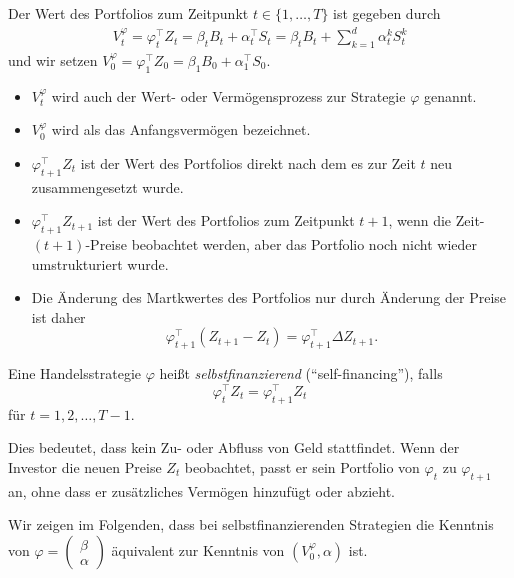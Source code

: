 \documentclass[a4paper,twoside,DIV15,BCOR12mm]{scrbook}
\begin{document}
\begin{definition}
\label{def:2.3.2}Der Wert des Portfolios zum Zeitpunkt $t\in\{1,\ldots,T\}$ ist gegeben durch 
\begin{align*}
V_t^\varphi  = \varphi_t^\top Z_t = \beta_t B_t + \alpha_t^\top S_t = \beta_tB_t + \sum_{k=1}^d \alpha_t^kS_t^k
\end{align*}
und wir setzen $V_0^\varphi = \varphi_1^\top Z_0 = \beta_1B_0 + \alpha_1^\top S_0$.
\end{definition}

\begin{bemerkung}
\begin{itemize}
\item $V_t^\varphi$ wird auch der Wert- oder Vermögensprozess zur Strategie $\varphi$ genannt.
\item $V_0^\varphi$ wird als das Anfangsvermögen bezeichnet.
\item $\varphi_{t+1}^\top Z_t$ ist der Wert des Portfolios direkt nach dem es zur Zeit $t$ neu zusammengesetzt wurde.
\item $\varphi_{t+1}^\top Z_{t+1}$ ist der Wert des Portfolios zum Zeitpunkt $t+1$, wenn die Zeit-$(t+1)$-Preise beobachtet werden, aber das Portfolio noch nicht wieder umstrukturiert wurde.
\item Die Änderung des Martkwertes des Portfolios nur durch Änderung der Preise ist daher
\[
\varphi_{t+1}^\top (Z_{t+1}-Z_t) = \varphi_{t+1}^\top \Delta Z_{t+1}.
\]
\end{itemize}
\end{bemerkung}

\begin{definition}
Eine Handelsstrategie $\varphi$ heißt \emph{selbstfinanzierend} (“self-financing”), falls
\[
\varphi_t^\top Z_t = \varphi_{t+1}^\top Z_t
\]
für $t=1, 2,\ldots,T-1$.
\end{definition}

Dies bedeutet, dass kein Zu- oder Abfluss von Geld stattfindet. Wenn der Investor die neuen Preise $Z_t$ beobachtet, passt er sein Portfolio von $\varphi_t$ zu $\varphi_{t+1}$ an, ohne dass er zusätzliches Vermögen hinzufügt oder abzieht.

Wir zeigen im Folgenden, dass bei selbstfinanzierenden Strategien die Kenntnis von $\varphi 
=\left(\begin{smallmatrix}
\beta \\ \alpha
\end{smallmatrix}\right)$
äquivalent zur Kenntnis von $(V_0^\varphi, \alpha)$ ist.
\end{document}
